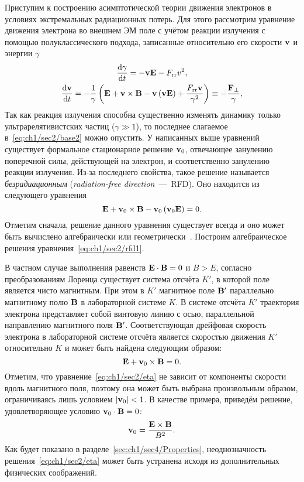 Приступим к построению асимптотической теории движения электронов в условиях экстремальных радиационных потерь.
Для этого рассмотрим уравнение движения электрона во внешнем ЭМ поле с учётом реакции излучения с помощью полуклассического подхода, записанные относительно его скорости $\vb{v}$ и энергии $\gamma$
\begin{gather}
    \label{eq:ch1/sec2/base1}
    \dv{\gamma}{t} = -\vb{vE} - F_\mathrm{rr} v^2 , \\
    \label{eq:ch1/sec2/base2}
    \dv{\vb{v}}{t} = - \frac{1}{\gamma}\left( \vb{E + v\times B - v\left( vE \right)} + \frac{F_\mathrm{rr}\vb{v}}{\gamma^2} \right) \equiv -\frac{\vb{F}_\perp}{\gamma} ,
\end{gather}
Так как реакция излучения способна существенно изменять динамику только ультрарелятивистских частиц ($\gamma \gg 1$), то последнее слагаемое в~\eqref{eq:ch1/sec2/base2} можно опустить.
У написанных выше уравнений существует формальное стационарное решение $\vb{v}_0$, отвечающее занулению поперечной силы, действующей на электрон, и соответственно занулению реакции излучения.
Из-за последнего свойства, такое решение называется \textit{безрадиационным} (\textit{radiation-free direction}~---~RFD).
Оно находится из следующего уравнения
\begin{equation}
    \label{eq:ch1/sec2/rfd1}
    \vb{E} + \vb{v}_0\times \vb{B} - \vb{v}_0\left( \vb{v}_0\vb{E} \right) = 0 .
\end{equation}
Отметим сначала, решение данного уравнения существует всегда и оно может быть вычислено алгебраически или геометрически~\cite{gonoskov2018radiation}.
Построим алгебраическое решения уравнения~\eqref{eq:ch1/sec2/rfd1}.

В частном случае выполнения равенств $\vb{E}\cdot\vb{B} = 0$ и $B > E$, согласно преобразованиям Лоренца существует система отсчёта $K'$, в которой поле является чисто магнитным. 
При этом в $K'$ магнитное поле $\vb{B}'$ параллельно магнитному полю $\vb{B}$ в лабораторной системе $K$. 
В системе отсчёта $K'$ траектория электрона представляет собой винтовую линию с осью, параллельной направлению магнитного поля $\vb{B}'$.
Соответствующая дрейфовая скорость электрона в лабораторной системе отсчёта является скоростью движения $K'$ относительно $K$ и может быть найдена следующим образом:
\begin{equation}
    \label{eq:ch1/sec2/eta}
    \vb{E} + \vb{v}_0 \times \vb{B} = 0.
\end{equation}
Отметим, что уравнение~\eqref{eq:ch1/sec2/eta} не зависит от компоненты скорости вдоль магнитного поля, поэтому она может быть выбрана произвольным образом, ограничиваясь лишь условием $|\vb{v}_0| < 1$.
В качестве примера, приведём решение, удовлетворяющее условию $\vb{v}_0 \cdot \vb{B} = 0$:
\begin{equation}
\label{eq:ch1/sec2/eta_explicit}
    \vb{v}_0 = \frac{\vb{E} \times \vb{B}}{B^2}.
\end{equation}
Как будет показано в разделе~\ref{sec:ch1/sec4/Properties}, неоднозначность решения~\eqref{eq:ch1/sec2/eta} может быть устранена исходя из дополнительных физических соображений.

